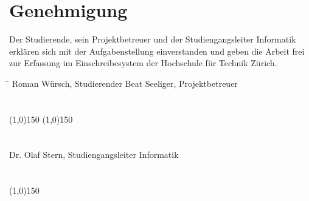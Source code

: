 \documentclass[listof=totoc,bibliography=totoc]{scrreprt}
\begin{document}
    \section{Genehmigung}
    Der Studierende, sein Projektbetreuer und der Studiengangsleiter 
    Informatik erklären sich mit der Aufgabenstellung einverstanden und geben 
    die Arbeit frei zur Erfassung im Einschreibesystem der Hochschule für 
    Technik Zürich.

    \begin{tabbing}
        \hspace*{10cm}\= \kill
    	Roman Würsch, Studierender \> Beat Seeliger, Projektbetreuer \\
    	\\
    	\\
        \line(1,0){150} \> \line(1,0){150} \\
        \\
        \\
    	Dr. Olaf Stern, Studiengangsleiter Informatik \\
    	\\
    	\\
        \line(1,0){150}
    \end{tabbing}    
\end{document}
